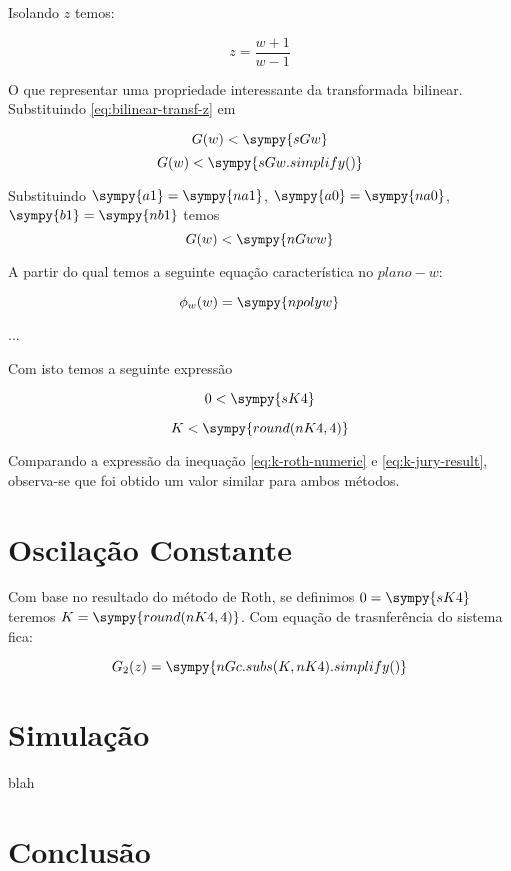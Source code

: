 \documentclass[a4paper,11pt]{article}
\newcommand{\npy}[1]{\sympy{round(#1,4)}}
\begin{document}
Isolando $z$ temos:

\begin{equation}\label{eq:bilinear-transf-z}
    z = \frac{w+1}{w-1}
\end{equation}

O que representar uma propriedade interessante da transformada bilinear. Substituindo \ref{eq:bilinear-transf-z} em

$$G(w) < \sympy{sGw}$$
$$G(w) < \sympy{sGw.simplify()}$$


Substituindo $\sympy{a1} = \sympy{na1}$, $\sympy{a0} = \sympy{na0}$, $\sympy{b1} = \sympy{nb1}$ temos
$$G(w) < \sympy{nGww}$$

A partir do qual temos a seguinte equação característica no $plano-w$:

\begin{equation}
    \phi_w(w) = \sympy{npolyw}
\end{equation}

...


Com isto temos a seguinte expressão

$$0 < \sympy{sK4}$$

\begin{equation}\label{eq:k-roth-numeric}
    K < \npy{nK4}
\end{equation}

Comparando a expressão da inequação \ref{eq:k-roth-numeric} e \ref{eq:k-jury-result}, observa-se que foi obtido um valor similar para ambos métodos.


\section{Oscilação Constante}

Com base no resultado do método de Roth, se definimos $0 = \sympy{sK4}$ teremos $K = \npy{nK4}$. Com equação de trasnferência do sistema fica:

\begin{equation}\label{eq:closedloop-sys-oscilation}
    G_{2}(z) = \sympy{nGc.subs(K,nK4).simplify()}
\end{equation}


\section{Simulação}

blah

\section{Conclusão}






\end{document}
